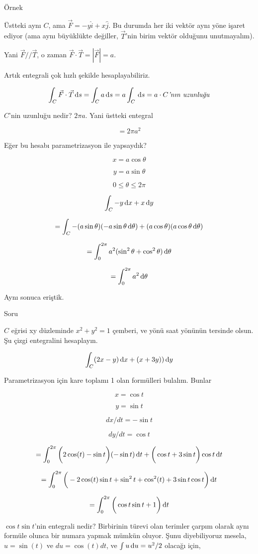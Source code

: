 \documentclass[12pt,fleqn]{article}\usepackage{../../common}
\begin{document}
Örnek

Üstteki aynı $C$, ama $\vec{F} = -y\hat{i} + x\hat{j}$. Bu durumda her iki
vektör aynı yöne işaret ediyor (ama aynı büyüklükte değiller, $\vec{T}$'nin
birim vektör olduğunu unutmayalım).

Yani $\vec{F} // \vec{T}$, o zaman $\vec{F} \cdot \vec{T} = |\vec{F}| =
a$.

Artık entegrali çok hızlı şekilde hesaplayabiliriz. 

$$
\int_C \vec{F} \cdot \vec{T} \,\mathrm{d} s 
=  \int_C a \,\mathrm{d} s  = a \int_C \,\mathrm{d} s 
= a \cdot C \textit{'nın uzunluğu}
$$

$C$'nin uzunluğu nedir? $2\pi a$. Yani üstteki entegral

$$ = 2\pi a^2 $$

Eğer bu hesabı parametrizasyon ile yapsaydık? 

$$ x = a\cos\theta $$

$$ y = a\sin\theta $$

$$ 0 \le \theta \le 2\pi $$

$$ \int_C -y \,\mathrm{d} x + x \,\mathrm{d} y $$

$$ = \int_C -(a\sin\theta)(-a\sin\theta \,\mathrm{d}\theta) + 
(a\cos\theta)(a \cos\theta \,\mathrm{d}\theta)
$$

$$ = \int_0^{2\pi} a^2 (\sin^2\theta + \cos^2\theta) \,\mathrm{d}\theta $$

$$ = \int_0^{2\pi} a^2 \,\mathrm{d}\theta $$

Aynı sonuca eriştik. 

Soru 

$C$ eğrisi xy düzleminde $x^2+y^2=1$ çemberi, ve yönü saat yönünün tersinde
olsun. Şu çizgi entegralini hesaplayın.

$$ \int_C (2x-y) \,\mathrm{d} x + (x+3y)) \,\mathrm{d} y $$

Parametrizasyon için kare toplamı 1 olan formülleri bulalım. Bunlar

$$ x = \cos t $$

$$ y = \sin t $$

$$ dx/dt = -\sin t$$

$$ dy/dt = \cos t $$

$$ =
\int_0^{2\pi} \bigg( 2\cos(t) - \sin t \bigg)(-\sin t ) \,\mathrm{d} t + 
\bigg(\cos t + 3\sin t \bigg) \cos t \,\mathrm{d} t
$$

$$ = 
\int_0^{2\pi}
\bigg(
-2\cos(t)\sin t + \sin^2 t + \cos^2(t) + 3 \sin t \cos t
\bigg) \,\mathrm{d} t
$$

$$ = 
\int_0^{2\pi} \bigg( \cos t \sin t + 1 \bigg) \,\mathrm{d} t
$$

$\cos t \sin t$'nin entegrali nedir? Birbirinin türevi olan terimler çarpım
olarak aynı formüle olunca bir numara yapmak mümkün oluyor. Şunu diyebiliyoruz
mesela, $u=\sin(t)$ ve $du=\cos(t)dt$, ve $\int u \,\mathrm{d} u = u^2/2$ olacağı için,
\end{document}
